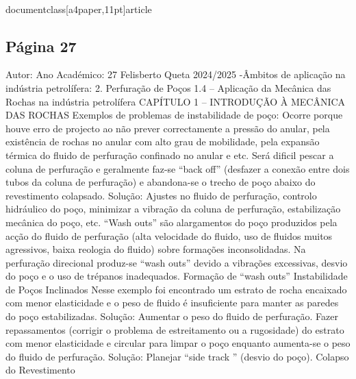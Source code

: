 \\documentclass[a4paper,11pt]{article}
\begin{document}
\subsection*{Página 27}
Autor:
Ano Académico:
27
Felisberto Queta
2024/2025
-Âmbitos de aplicação na indústria petrolífera:
2. Perfuração de Poços
1.4 – Aplicação da Mecânica das Rochas na indústria petrolífera
CAPÍTULO 1 – INTRODUÇÃO À MECÂNICA DAS ROCHAS
Exemplos de problemas de instabilidade de poço:
Ocorre porque houve erro de projecto ao 
não prever correctamente a pressão do 
anular, pela existência de rochas no anular 
com alto grau de mobilidade, pela expansão 
térmica do fluido de perfuração confinado no 
anular e etc.
Será dificil pescar a coluna de perfuração e 
geralmente faz-se “back off” (desfazer a 
conexão entre dois tubos da coluna de 
perfuração) e abandona-se o trecho de poço 
abaixo do revestimento colapsado.
Solução: Ajustes no fluido de perfuração, 
controlo hidráulico do poço, minimizar a 
vibração da coluna de perfuração, 
estabilização mecânica do poço, etc.
“Wash outs” são alargamentos do poço 
produzidos pela acção do fluido de perfuração 
(alta velocidade do fluido, uso de fluidos 
muitos agressivos, baixa reologia do fluido) 
sobre formações inconsolidadas. Na perfuração 
direcional produz-se “wash outs” devido a 
vibrações excessivas, desvio do poço e o uso de 
trépanos inadequados.
Formação de 
“wash outs”
Instabilidade de 
Poços Inclinados
Nesse exemplo foi encontrado um estrato de 
rocha encaixado com menor elasticidade e o 
peso de fluido é insuficiente para manter as 
paredes do poço estabilizadas.
Solução: Aumentar o peso do fluido de 
perfuração. Fazer repassamentos (corrigir o 
problema de estreitamento ou a rugosidade) do 
estrato com menor elasticidade e circular para 
limpar o poço enquanto aumenta-se o peso do 
fluido de perfuração.
Solução: Planejar “side track ” (desvio 
do poço).
Colapso do 
Revestimento
\end{document}
